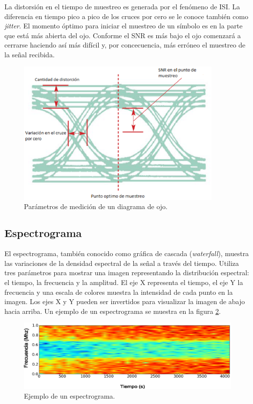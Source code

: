 La distorsi\'on en el tiempo de muestreo es generada por el fen\'omeno de ISI. La diferencia en
tiempo pico a pico de los cruces por cero se le conoce tambi\'en como \emph{jitter}. El momento
\'optimo para iniciar el muestreo de un s\'imbolo es en la parte que est\'a m\'as abierta del ojo. Conforme el
SNR es m\'as bajo el ojo comenzar\'a a cerrarse haciendo as\'i m\'as dif\'icil y, por concecuencia,
m\'as err\'oneo el muestreo de la se\~nal recibida.

\begin{figure}[hbp]
\centering
	\includegraphics[width=4in]{figs/eyeparams}
	\caption{Par\'ametros de medici\'on de un diagrama de ojo.}
	\label{fig:eyeparams}
\end{figure}

\subsection{Espectrograma}
El espectrograma, tambi\'en conocido como gr\'afica de cascada (\emph{waterfall}), muestra las variaciones de la densidad
espectral de la se\~nal a trav\'es del tiempo. Utiliza tres par\'ametros para mostrar una imagen representando la distribuci\'on
espectral: el tiempo, la frecuencia y la amplitud. El eje X representa el tiempo, el eje Y la frecuencia y una escala de colores
muestra la intensidad de cada punto en la imagen. Los ejes X y Y pueden ser invertidos para visualizar la imagen de abajo hacia
arriba. Un ejemplo de un espectrograma se muestra en la figura \ref{fig:spectrogram}.

\begin{figure}[tp]
\centering
	\includegraphics[width=5.5in]{figs/spectrogram}
	\vspace{0.3in}
	\caption{Ejemplo de un espectrograma.}
	\label{fig:spectrogram}
\end{figure}

